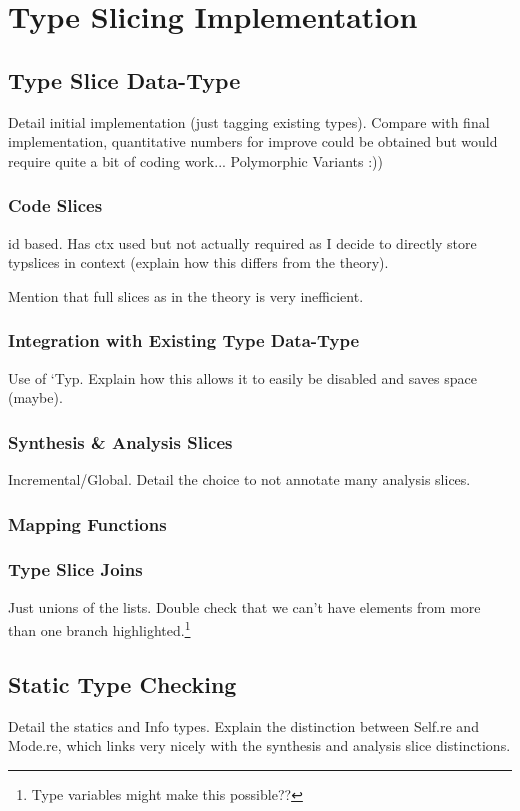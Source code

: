 \section{Type Slicing Implementation}\label{sec:TypeSlicingImplementation}
\subsection{Type Slice Data-Type}\label{sec:TypeSliceDataType}
Detail initial implementation (just tagging existing types). Compare with final implementation, quantitative numbers for improve could be obtained but would require quite a bit of coding work... Polymorphic Variants :))
\subsubsection{Code Slices}\label{sec:CodeSlices}
id based. Has ctx used but not actually required as I decide to directly store typslices in context (explain how this differs from the theory).

Mention that full slices as in the theory is very inefficient.
\subsubsection{Integration with Existing Type Data-Type}
Use of `Typ. Explain how this allows it to easily be disabled and saves space (maybe).
\subsubsection{Synthesis \& Analysis Slices}
Incremental/Global. Detail the choice to not annotate many analysis slices.
\subsubsection{Mapping Functions}
\subsubsection{Type Slice Joins}
Just unions of the lists. Double check that we can't have elements from more than one branch highlighted.\footnote{Type variables might make this possible??}

\subsection{Static Type Checking}\label{sec:TypeChecking}
Detail the statics and Info types. Explain the distinction between Self.re and Mode.re, which links very nicely with the synthesis and analysis slice distinctions.

